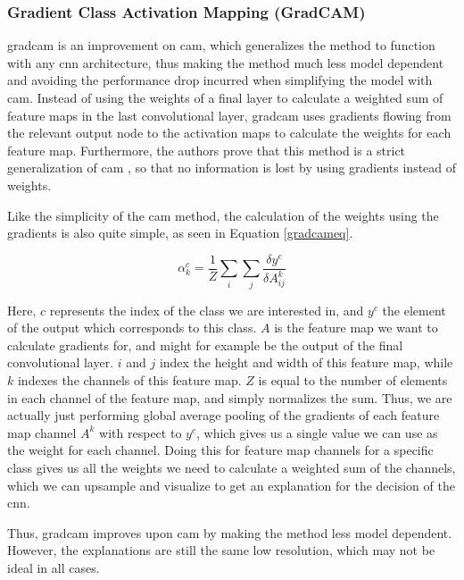 \documentclass[UKenglish]{uiomasterthesis} %
\theoremstyle{definition}
\begin{document}
\subsubsection{Gradient Class Activation Mapping (GradCAM)} \label{section:gradcam}

\ac{gradcam} \cite{gradcam} is an improvement on \ac{cam}, which generalizes the method to function with any \ac{cnn} architecture, thus making the method much less model dependent and avoiding the performance drop incurred when simplifying the model with \ac{cam}. Instead of using the weights of a final layer to calculate a weighted sum of feature maps in the last convolutional layer, \ac{gradcam} uses gradients flowing from the relevant output node to the activation maps to calculate the weights for each feature map. Furthermore, the authors prove that this method is a strict generalization of \ac{cam} \cite[5]{gradcam}, so that no information is lost by using gradients instead of weights.

Like the simplicity of the \ac{cam} method, the calculation of the weights using the gradients is also quite simple, as seen in Equation \ref{gradcameq}.

\begin{equation}
\alpha^c_k = \frac{1}{Z} \sum_i \sum_j \frac{\delta y^c}{\delta A^k_{ij}}
\label{gradcameq}
\end{equation}

\noindent Here, $c$ represents the index of the class we are interested in, and $y^c$ the element of the output which corresponds to this class. $A$ is the feature map we want to calculate gradients for, and might for example be the output of the final convolutional layer. $i$ and $j$ index the height and width of this feature map, while $k$ indexes the channels of this feature map. $Z$ is equal to the number of elements in each channel of the feature map, and simply normalizes the sum. Thus, we are actually just performing global average pooling of the gradients of each feature map channel $A^k$ with respect to $y^c$, which gives us a single value we can use as the weight for each channel. Doing this for feature map channels for a specific class gives us all the weights we need to calculate a weighted sum of the channels, which we can upsample and visualize to get an explanation for the decision of the \ac{cnn}.

Thus, \ac{gradcam} improves upon \ac{cam} by making the method less model dependent. However, the explanations are still the same low resolution, which may not be ideal in all cases.
\end{document}
